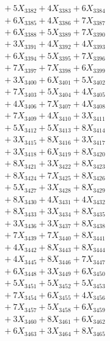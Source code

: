 \documentclass[a4paper,10pt]{article}
\begin{document}
{\begin{align}
&\;  + 5 X_{3382} + 4 X_{3383} + 6 X_{3384} \\[0.3ex]
&\;  + 6 X_{3385} + 4 X_{3386} + 7 X_{3387} \\[0.3ex]
&\;  + 6 X_{3388} + 5 X_{3389} + 7 X_{3390} \\[0.3ex]
&\;  + 3 X_{3391} + 4 X_{3392} + 4 X_{3393} \\[0.3ex]
&\;  + 6 X_{3394} + 5 X_{3395} + 7 X_{3396} \\[0.3ex]
&\;  + 7 X_{3397} + 7 X_{3398} + 6 X_{3399} \\[0.5ex]\allowbreak
&\;  + 3 X_{3400} + 6 X_{3401} + 5 X_{3402} \\[0.3ex]
&\;  + 7 X_{3403} + 5 X_{3404} + 4 X_{3405} \\[0.3ex]
&\;  + 4 X_{3406} + 7 X_{3407} + 4 X_{3408} \\[0.3ex]
&\;  + 7 X_{3409} + 4 X_{3410} + 3 X_{3411} \\[0.3ex]
&\;  + 5 X_{3412} + 5 X_{3413} + 8 X_{3414} \\[0.3ex]
&\;  + 3 X_{3415} + 8 X_{3416} + 3 X_{3417} \\[0.3ex]
&\;  + 3 X_{3418} + 6 X_{3419} + 8 X_{3420} \\[0.3ex]
&\;  + 8 X_{3421} + 3 X_{3422} + 8 X_{3423} \\[0.3ex]
&\;  + 8 X_{3424} + 7 X_{3425} + 8 X_{3426} \\[0.3ex]
&\;  + 5 X_{3427} + 3 X_{3428} + 8 X_{3429} \\[0.5ex]\allowbreak
&\;  + 8 X_{3430} + 4 X_{3431} + 4 X_{3432} \\[0.3ex]
&\;  + 8 X_{3433} + 3 X_{3434} + 8 X_{3435} \\[0.3ex]
&\;  + 3 X_{3436} + 3 X_{3437} + 8 X_{3438} \\[0.3ex]
&\;  + 7 X_{3439} + 7 X_{3440} + 8 X_{3441} \\[0.3ex]
&\;  + 4 X_{3442} + 8 X_{3443} + 8 X_{3444} \\[0.3ex]
&\;  + 4 X_{3445} + 8 X_{3446} + 7 X_{3447} \\[0.3ex]
&\;  + 6 X_{3448} + 3 X_{3449} + 6 X_{3450} \\[0.3ex]
&\;  + 5 X_{3451} + 5 X_{3452} + 5 X_{3453} \\[0.3ex]
&\;  + 7 X_{3454} + 6 X_{3455} + 4 X_{3456} \\[0.3ex]
&\;  + 7 X_{3457} + 5 X_{3458} + 6 X_{3459} \\[0.5ex]\allowbreak
&\;  + 3 X_{3460} + 8 X_{3461} + 6 X_{3462} \\[0.3ex]
&\;  + 6 X_{3463} + 3 X_{3464} + 8 X_{3465} \\[0.3ex]

\end{align}}
\end{document}
